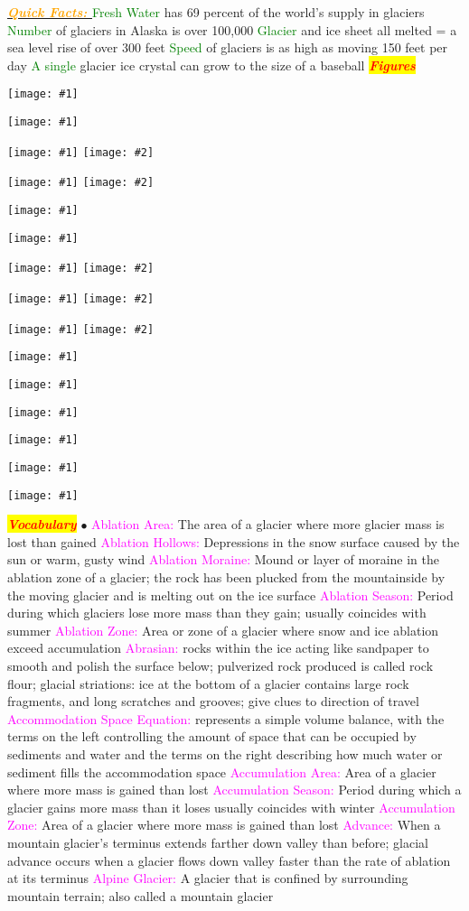 \documentclass{article}
\newcommand{\ddd}{$\bullet$}
\newcommand{\red}[1]{\textcolor{red}{#1}}
\newcommand{\green}[1]{\textcolor{green}{#1}}
\newcommand{\pink}[1]{\textcolor{magenta}{#1}}
\newcommand{\orange}[1]{\textcolor{orange}{#1}}
\newcommand{\mysection}[1]{\colorbox{yellow}{{\textbf{\textbf{\textit{\red{#1}}}}}}}
\newcommand{\mysub}[1]{\underline{\textbf{{\textit{\orange{#1}}}}}}
\newcommand{\mysubsub}[1]{{{\green{#1}}}}
\newcommand{\vocab}[1]{{\pink{#1}}}
\newcommand{\fig}[1]{
	\texttt{[image: \#1]}
}
\newcommand{\figtwo}[2]{
	\texttt{[image: \#1]}
	\texttt{[image: \#2]}
}
\begin{document}
\begin{multicols*}{4}
		    \mysub{Quick Facts: }
		    \mysubsub{Fresh Water} has 69 percent of the world's supply in glaciers
		    \mysubsub{Number} of glaciers in Alaska is over 100,000
		    \mysubsub{Glacier} and ice sheet all melted = a sea level rise of over 300 feet
		    \mysubsub{Speed} of glaciers is as high as moving 150 feet per day
		    \mysubsub{A single} glacier ice crystal can grow to the size of a baseball
	\mysection{Figures}
	\fig{iceshelf_locations}
	\fig{othersea}
	\figtwo{arctic}{lgm}
	\figtwo{corrie}{milan}
	\fig{seaice}
	\fig{na}
	\figtwo{southern}{greenland}
	\figtwo{fjord}{glacier}
	\figtwo{lauren}{cordi}
	\fig{wordlmap}
	\fig{filler}
	\fig{stoss}
	\fig{alpine}
	\fig{varve}
	\fig{volume}
	
	\pagebreak
	\mysection{Vocabulary} 
		\ddd
		\vocab{        Ablation Area: } The area of a glacier where more glacier mass is lost than gained 
		\vocab{        Ablation Hollows: } Depressions in the snow surface caused by the sun or warm, gusty wind 
		\vocab{        Ablation Moraine: } Mound or layer of moraine in the ablation zone of a glacier; the rock has been plucked from the mountainside by the moving glacier and is melting out on the ice surface 
		\vocab{        Ablation Season: } Period during which glaciers lose more mass than they gain; usually coincides with summer 
		\vocab{        Ablation Zone: } Area or zone of a glacier where snow and ice ablation exceed accumulation 
		\vocab{Abrasian: } rocks within the ice acting like sandpaper to smooth and polish the surface below; pulverized rock produced is called rock flour; glacial striations: ice at the bottom of a glacier contains large rock fragments, and long scratches and grooves; give clues to direction of travel  
		\vocab{Accommodation Space Equation:} represents a simple volume balance, with the terms on the left controlling the amount of space that can be occupied by sediments and water and the terms on the right describing how much water or sediment fills the accommodation space  
		\vocab{        Accumulation Area: } Area of a glacier where more mass is gained than lost 
		\vocab{        Accumulation Season: } Period during which a glacier gains more mass than it loses usually coincides with winter 
		\vocab{        Accumulation Zone: } Area of a glacier where more mass is gained than lost 
		\vocab{        Advance: } When a mountain glacier’s terminus extends farther down valley than before; glacial advance occurs when a glacier flows down valley faster than the rate of ablation at its terminus 
		\vocab{        Alpine Glacier: } A glacier that is confined by surrounding mountain terrain; also called a mountain glacier  

\end{multicols*}
\end{document}
